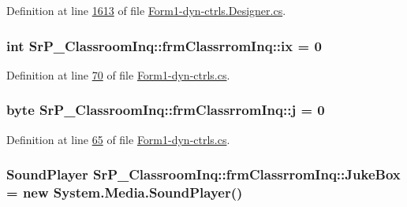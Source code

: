 \-Definition at line \hyperlink{_form1-dyn-ctrls_8_designer_8cs_source_l01613}{1613} of file \hyperlink{_form1-dyn-ctrls_8_designer_8cs_source}{\-Form1-\/dyn-\/ctrls.\-Designer.\-cs}.

\hypertarget{class_sr_p___classroom_inq_1_1frm_classrrom_inq_a1f5209850965916fddf21b2409e6204a}{
\subsubsection[{ix}]{\setlength{\rightskip}{0pt plus 5cm}int {\bf \-Sr\-P\-\_\-\-Classroom\-Inq\-::frm\-Classrrom\-Inq\-::ix} = 0}}
\label{class_sr_p___classroom_inq_1_1frm_classrrom_inq_a1f5209850965916fddf21b2409e6204a}


\-Definition at line \hyperlink{_form1-dyn-ctrls_8cs_source_l00070}{70} of file \hyperlink{_form1-dyn-ctrls_8cs_source}{\-Form1-\/dyn-\/ctrls.\-cs}.

\hypertarget{class_sr_p___classroom_inq_1_1frm_classrrom_inq_a2eb87c50d0e2c90c1256a6e26cc8a651}{
\subsubsection[{j}]{\setlength{\rightskip}{0pt plus 5cm}byte {\bf \-Sr\-P\-\_\-\-Classroom\-Inq\-::frm\-Classrrom\-Inq\-::j} = 0}}
\label{class_sr_p___classroom_inq_1_1frm_classrrom_inq_a2eb87c50d0e2c90c1256a6e26cc8a651}


\-Definition at line \hyperlink{_form1-dyn-ctrls_8cs_source_l00065}{65} of file \hyperlink{_form1-dyn-ctrls_8cs_source}{\-Form1-\/dyn-\/ctrls.\-cs}.

\hypertarget{class_sr_p___classroom_inq_1_1frm_classrrom_inq_a10f0b7ba2800c1353aeee71344d08a94}{
\subsubsection[{\-Juke\-Box}]{\setlength{\rightskip}{0pt plus 5cm}\-Sound\-Player {\bf \-Sr\-P\-\_\-\-Classroom\-Inq\-::frm\-Classrrom\-Inq\-::\-Juke\-Box} = new \-System.\-Media.\-Sound\-Player()}}
\label{class_sr_p___classroom_inq_1_1frm_classrrom_inq_a10f0b7ba2800c1353aeee71344d08a94}


